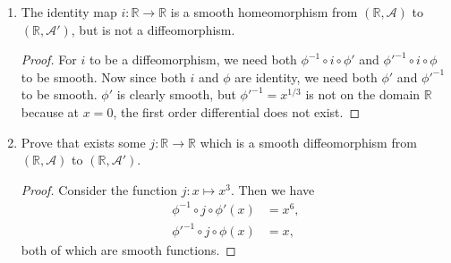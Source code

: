 \documentclass{article}
\begin{document}
\begin{enumerate}[label={\bf Q\arabic*:}]
    \begin{enumerate}
      \item The identity map $i:\mathbb{R}\rightarrow\mathbb{R}$ is a
        smooth homeomorphism from $(\mathbb{R},\mathcal{A})$ to
        $(\mathbb{R},\mathcal{A}')$, but is not a diffeomorphism.

        \begin{proof}
          For $i$ to be a diffeomorphism, we need both $\phi^{-1}\circ
          i\circ\phi'$ and $\phi'^{-1}\circ i\circ\phi$ to be smooth. Now
          since both $i$ and $\phi$ are identity, we need both $\phi'$ and
          $\phi'^{-1}$ to be smooth. $\phi'$ is clearly smooth, but
          $\phi'^{-1}=x^{1/3}$ is not on the domain $\mathbb{R}$ because
          at $x=0$, the first order differential does not exist.
        \end{proof}

      \item Prove that exists some $j:\mathbb{R}\rightarrow\mathbb{R}$
        which is a smooth diffeomorphism from $(\mathbb{R},\mathcal{A})$ to
        $(\mathbb{R},\mathcal{A}')$.

        \begin{proof}
          Consider the function $j:x\mapsto x^3$. Then we have
          \begin{align*}
            \phi^{-1}\circ j\circ\phi'(x) &=x^6, \\
            \phi'^{-1}\circ j\circ\phi(x) &=x,
          \end{align*}
          both of which are smooth functions.
        \end{proof}
    \end{enumerate}
\end{enumerate}
\end{document}
